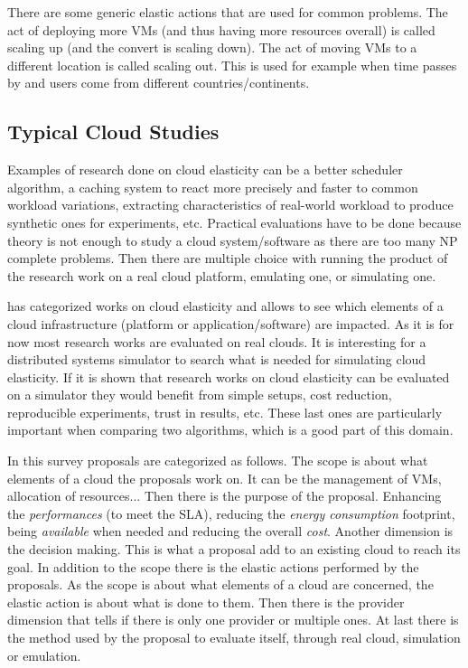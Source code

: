 \documentclass[a4paper, onecolumn, 11pt]{article}
\begin{document}
  There are some generic elastic actions that are used for common problems. The
  act of deploying more VMs (and thus having more resources overall) is called
  scaling up (and the convert is scaling down). The act of moving VMs to a
  different location is called scaling out. This is used for example when time
  passes by and users come from different countries/continents.
  
  \subsection{Typical Cloud Studies}
  Examples of research done on cloud elasticity can be a better scheduler
  algorithm, a caching system to react more precisely and faster to common
  workload variations, extracting characteristics of real-world workload to
  produce synthetic ones for experiments, etc. Practical evaluations have to be
  done because theory is not enough to study a cloud system/software as there
  are too many NP complete problems. Then there are multiple choice with running
  the product of the research work on a real cloud platform, emulating one, or
  simulating one.
  
  \cite{Naskos2016} has categorized works on cloud elasticity and allows to see
  which elements of a cloud infrastructure (platform or application/software)
  are impacted. As it is for now most research works are evaluated on real
  clouds. It is interesting for a distributed systems simulator to search what
  is needed for simulating cloud elasticity. If it is shown that research works
  on cloud elasticity can be evaluated on a simulator they would benefit from
  simple setups, cost reduction, reproducible experiments, trust in results,
  etc. These last ones are particularly important when comparing two algorithms,
  which is a good part of this domain.
  
  In this survey proposals are categorized as follows. The scope is about what
  elements of a cloud the proposals work on. It can be the management of VMs,
  allocation of resources... Then there is the purpose of the proposal.
  Enhancing the \textit{performances} (to meet the SLA), reducing the
  \textit{energy consumption} footprint, being \textit{available} when needed
  and reducing the overall \textit{cost}. Another dimension is the decision
  making. This is what a proposal add to an existing cloud to reach its goal. In
  addition to the scope there is the elastic actions performed by the proposals.
  As the scope is about what elements of a cloud are concerned, the elastic
  action is about what is done to them. Then there is the provider dimension
  that tells if there is only one provider or multiple ones. At last there is
  the method used by the proposal to evaluate itself, through real cloud,
  simulation or emulation.
  
\end{document}
